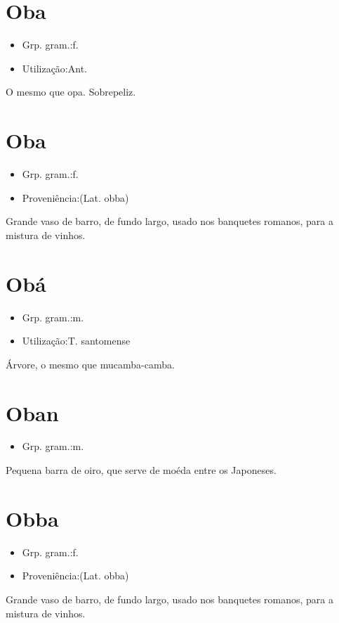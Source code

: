 \section{Oba}
\begin{itemize}
\item {Grp. gram.:f.}
\end{itemize}
\begin{itemize}
\item {Utilização:Ant.}
\end{itemize}
O mesmo que \textunderscore opa\textunderscore .
Sobrepeliz.
\section{Oba}
\begin{itemize}
\item {Grp. gram.:f.}
\end{itemize}
\begin{itemize}
\item {Proveniência:(Lat. \textunderscore obba\textunderscore )}
\end{itemize}
Grande vaso de barro, de fundo largo, usado nos banquetes romanos, para a mistura de vinhos.
\section{Obá}
\begin{itemize}
\item {Grp. gram.:m.}
\end{itemize}
\begin{itemize}
\item {Utilização:T. santomense}
\end{itemize}
Árvore, o mesmo que \textunderscore mucamba-camba\textunderscore .
\section{Oban}
\begin{itemize}
\item {Grp. gram.:m.}
\end{itemize}
Pequena barra de oiro, que serve de moéda entre os Japoneses.
\section{Obba}
\begin{itemize}
\item {Grp. gram.:f.}
\end{itemize}
\begin{itemize}
\item {Proveniência:(Lat. \textunderscore obba\textunderscore )}
\end{itemize}
Grande vaso de barro, de fundo largo, usado nos banquetes romanos, para a mistura de vinhos.
